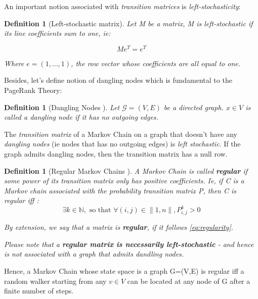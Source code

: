 \documentclass[sn-mathphys]{sn-jnl}%
\theoremstyle{thmstyleone}%
\theoremstyle{thmstyletwo}%
\theoremstyle{thmstylethree}%
\newtheorem{definition}[theo]{Definition}
\begin{document}
An important notion associated with \textit{transition matrices} is
\textit{left-stochasticity}:

\begin{definition}[Left-stochastic matrix]

  Let M be a matrix, M is left-stochastic if its line coefficients sum
  to one, ie:

  \begin{equation}
    M e^T = e^T
  \end{equation}
  
  Where $e = (1, \hdots, 1)$, the row vector whose coefficients are all
  equal to one.
  
\end{definition}

Besides, let's define notion of dangling nodes which is fundamental to
the PageRank Theory:

\begin{definition}[Dangling Nodes \cite{langville_meyer_2004}]\label{def:dangling}
Let $\mathcal{G}=(V,E)$ be a directed graph. $x \in V$ is called a dangling node if it has no outgoing edges.
\end{definition}

The \textit{transition matrix} of a Markov Chain on a graph that
doesn't have any \textit{dangling nodes} (ie nodes that has no
outgoing edges) is \textit{left stochastic}. If the graph admits
dangling nodes, then the transition matrix has a null row.

\begin{definition}[Regular Markov Chains \cite{grinstead_snell_2006}]
\label{def:Regular_Markov}
A Markov Chain is called \textbf{regular} if some power of its
transition matrix only has positive coefficients. Ie, if C is a Markov
chain associated with the probability transition matrix P, then C is
regular iff : \begin{equation}\label{eq:regularity} \exists k \in
  \mathbb{N}, \mbox{ so that } \forall (i,j) \in \|1, n\|, P^k_{i,j}>0
\end{equation}

By extension, we say that a matrix is \textbf{regular}, if it follows
\ref{eq:regularity}.

Please note that a \textbf{regular matrix is necessarily
  left-stochastic} - and hence is not associated with a graph that
admits dandling nodes.

\end{definition}

Hence, a Markov Chain whose state space is a graph G=(V,E) is regular
iff a random walker starting from any $v \in V$ can be located at any
node of G after a finite number of steps.
\end{document}
